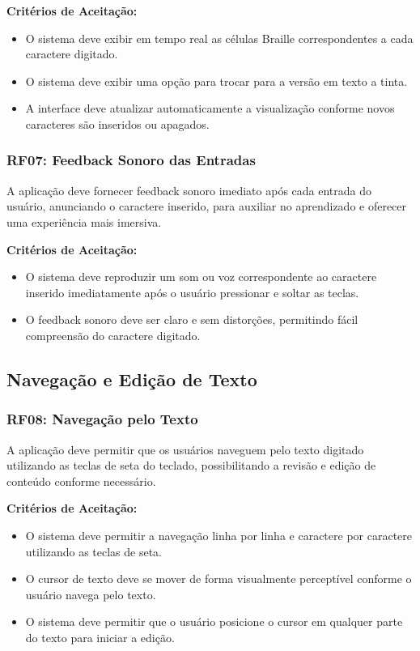 \textbf{Critérios de Aceitação:}
\begin{itemize}
    \item O sistema deve exibir em tempo real as células Braille correspondentes a cada caractere digitado.
    \item O sistema deve exibir uma opção para trocar para a versão em texto a tinta.
    \item A interface deve atualizar automaticamente a visualização conforme novos caracteres são inseridos ou apagados.
\end{itemize}

\subsubsection{\gls{RF}07: Feedback Sonoro das Entradas}

A aplicação deve fornecer feedback sonoro imediato após cada entrada do usuário, anunciando o caractere inserido, para auxiliar no aprendizado e oferecer uma experiência mais imersiva.

\textbf{Critérios de Aceitação:}
\begin{itemize}
    \item O sistema deve reproduzir um som ou voz correspondente ao caractere inserido imediatamente após o usuário pressionar e soltar as teclas.
    \item O feedback sonoro deve ser claro e sem distorções, permitindo fácil compreensão do caractere digitado.
\end{itemize}

\subsection{Navegação e Edição de Texto}

\subsubsection{\gls{RF}08: Navegação pelo Texto}

A aplicação deve permitir que os usuários naveguem pelo texto digitado utilizando as teclas de seta do teclado, possibilitando a revisão e edição de conteúdo conforme necessário.

\textbf{Critérios de Aceitação:}
\begin{itemize}
    \item O sistema deve permitir a navegação linha por linha e caractere por caractere utilizando as teclas de seta.
    \item O cursor de texto deve se mover de forma visualmente perceptível conforme o usuário navega pelo texto.
    \item O sistema deve permitir que o usuário posicione o cursor em qualquer parte do texto para iniciar a edição.
\end{itemize}

